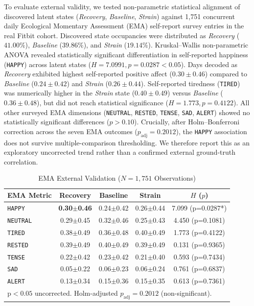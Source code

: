 \documentclass[conference]{IEEEtran}
\begin{document}
To evaluate external validity, we tested non-parametric statistical alignment of discovered latent states (\textit{Recovery}, \textit{Baseline}, \textit{Strain}) against 1{,}751 concurrent daily Ecological Momentary Assessment (EMA) self-report survey entries in the real Fitbit cohort. Discovered state occupancies were distributed as \textit{Recovery} ($41.00\%$), \textit{Baseline} ($39.86\%$), and \textit{Strain} ($19.14\%$). Kruskal--Wallis non-parametric ANOVA revealed statistically significant differentiation in self-reported happiness (\texttt{HAPPY}) across latent states ($H = 7.0991, p = 0.0287 < 0.05$). Days decoded as \textit{Recovery} exhibited highest self-reported positive affect ($0.30 \pm 0.46$) compared to \textit{Baseline} ($0.24 \pm 0.42$) and \textit{Strain} ($0.26 \pm 0.44$). Self-reported tiredness (\texttt{TIRED}) was numerically higher in the \textit{Strain} state ($0.40 \pm 0.49$) versus \textit{Baseline} ($0.36 \pm 0.48$), but did not reach statistical significance ($H = 1.773, p = 0.4122$). All other surveyed EMA dimensions (\texttt{NEUTRAL}, \texttt{RESTED}, \texttt{TENSE}, \texttt{SAD}, \texttt{ALERT}) showed no statistically significant differences ($p > 0.10$). Crucially, after Holm--Bonferroni correction across the seven EMA outcomes ($p_{\text{adj}} = 0.2012$), the \texttt{HAPPY} association does not survive multiple-comparison thresholding. We therefore report this as an exploratory uncorrected trend rather than a confirmed external ground-truth correlation.

\begin{table}[!htb]
\caption{EMA External Validation ($N=1,751$ Observations)}
\label{tab:ema_validation}
\centering
\small
\setlength{\tabcolsep}{4pt}
\begin{tabular}{lcccc}
\toprule
\textbf{EMA Metric} & \textbf{Recovery} & \textbf{Baseline} & \textbf{Strain} & \textbf{$H$ ($p$)} \\
\midrule
\texttt{HAPPY} & \textbf{0.30$\pm$0.46} & 0.24$\pm$0.42 & 0.26$\pm$0.44 & 7.099 (p=0.0287*) \\
\texttt{NEUTRAL} & 0.29$\pm$0.45 & 0.32$\pm$0.46 & 0.25$\pm$0.43 & 4.450 (p=0.1081) \\
\texttt{TIRED} & 0.38$\pm$0.49 & 0.36$\pm$0.48 & 0.40$\pm$0.49 & 1.773 (p=0.4122) \\
\texttt{RESTED} & 0.39$\pm$0.49 & 0.40$\pm$0.49 & 0.39$\pm$0.49 & 0.131 (p=0.9365) \\
\texttt{TENSE} & 0.22$\pm$0.42 & 0.23$\pm$0.42 & 0.21$\pm$0.40 & 0.593 (p=0.7434) \\
\texttt{SAD} & 0.05$\pm$0.22 & 0.06$\pm$0.23 & 0.06$\pm$0.24 & 0.761 (p=0.6837) \\
\texttt{ALERT} & 0.13$\pm$0.34 & 0.15$\pm$0.36 & 0.15$\pm$0.35 & 0.613 (p=0.7361) \\
\bottomrule
\multicolumn{5}{l}{\footnotesize *p$<0.05$ uncorrected. Holm-adjusted $p_{\text{adj}} = 0.2012$ (non-significant).}
\end{tabular}
\end{table}
\end{document}
